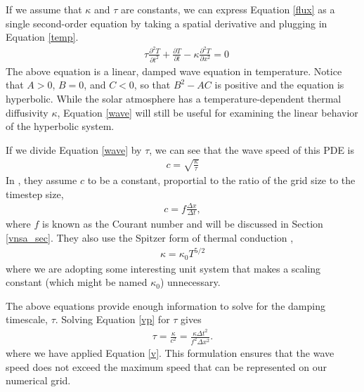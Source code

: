 \documentclass[iop]{emulateapj}
\begin{document}
				If we assume that $\kappa$ and $\tau$ are constants, we can express Equation \ref{flux} as a single second-order equation by taking a spatial derivative and plugging in Equation \ref{temp}.
				\begin{align}
					& \tau \frac{\partial^2 T}{\partial t^2} +  \frac{\partial T}{\partial t} - \kappa \frac{\partial^2 T}{\partial x^2} = 0 \label{wave}
				\end{align}
				The above equation is a linear, damped wave equation in temperature. Notice that $A > 0$, $B = 0$, and $C < 0$, so that $B^2 - A C$ is positive and the equation is hyperbolic.	
				While the solar atmosphere has a temperature-dependent thermal diffusivity $\kappa$, Equation \ref{wave} will still be useful for examining the linear behavior of the hyperbolic system.
		
				If we divide Equation \ref{wave} by $\tau$, we can see that the wave speed of this PDE is 
				\begin{align}
					c = \sqrt{\frac{\kappa}{\tau}} \label{vp}
				\end{align}
				In , they assume $c$ to be a constant, proportial to the ratio of the grid size to the timestep size,
				\begin{align}
					c = f \frac{\Delta x}{\Delta t} \label{v},
				\end{align}
				where $f$ is known as the Courant number and will be discussed in Section \ref{vnsa_sec}.
				They also use the Spitzer form of thermal conduction \citep{spitzer_62}, 
				\begin{align}
					\kappa = \kappa_0 T^{5/2}
				\end{align}
				where we are adopting some interesting unit system that makes a scaling constant (which might be named $\kappa_0$) unnecessary.
				
				The above equations provide enough information to solve for the damping timescale, $\tau$. Solving Equation \ref{vp} for $\tau$ gives
				\begin{align}
					\tau = \frac{\kappa}{c^2} = \frac{\kappa \Delta t^2}{f^2 \Delta x^2}.
				\end{align}
				where we have applied Equation \ref{v}. 
				This formulation ensures that the wave speed does not exceed the maximum speed that can be represented on our numerical grid.
				
\end{document}
